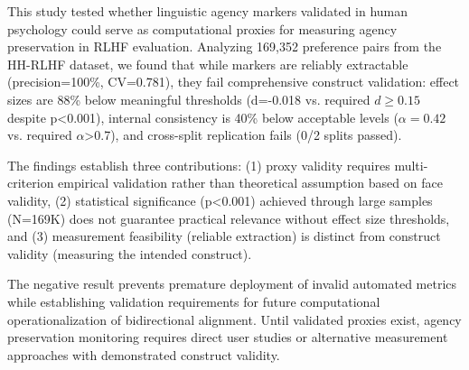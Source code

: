 
This study tested whether linguistic agency markers validated in human psychology could serve as computational proxies for measuring agency preservation in RLHF evaluation. Analyzing 169,352 preference pairs from the HH-RLHF dataset, we found that while markers are reliably extractable (precision=100\%, CV=0.781), they fail comprehensive construct validation: effect sizes are 88\% below meaningful thresholds (d=-0.018 vs. required $d\geq 0.15$ despite p<0.001), internal consistency is 40\% below acceptable levels ($\alpha =0.42$ vs. required $\alpha$>0.7), and cross-split replication fails (0/2 splits passed).

The findings establish three contributions: (1) proxy validity requires multi-criterion empirical validation rather than theoretical assumption based on face validity, (2) statistical significance (p<0.001) achieved through large samples (N=169K) does not guarantee practical relevance without effect size thresholds, and (3) measurement feasibility (reliable extraction) is distinct from construct validity (measuring the intended construct).

The negative result prevents premature deployment of invalid automated metrics while establishing validation requirements for future computational operationalization of bidirectional alignment. Until validated proxies exist, agency preservation monitoring requires direct user studies or alternative measurement approaches with demonstrated construct validity.
